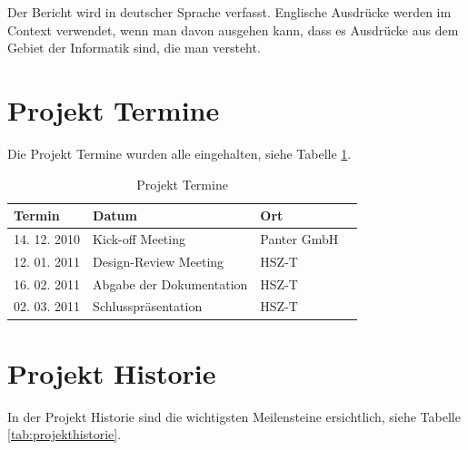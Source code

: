 \documentclass[abstracton, listof=totocnumbered,
bibliography=totocnumbered]{scrreprt}
\begin{document}
  Der Bericht wird in deutscher Sprache verfasst. Englische Ausdrücke werden im
  Context verwendet, wenn man davon ausgehen kann, dass es Ausdrücke aus dem
  Gebiet der Informatik sind, die man versteht.
  
  \newpage
  
  \section{Projekt Termine}
  
  Die Projekt Termine wurden alle eingehalten, siehe Tabelle \ref{tab:termine}.
  \newline
  
  \begin{table}[h]
    \begin{center}
      \begin{tabular}{lp{7cm}ll}
        \toprule
        Termin & Datum & Ort \\
        \midrule
        14. 12. 2010 & Kick-off Meeting & Panter GmbH\\
        12. 01. 2011 & Design-Review Meeting & HSZ-T\\
        16. 02. 2011 & Abgabe der Dokumentation & HSZ-T\\
        02. 03. 2011 & Schlusspräsentation & HSZ-T\\
        \bottomrule
      \end{tabular}
      \caption{Projekt Termine}
      \label{tab:termine}
    \end{center}
  \end{table}
  
  \section{Projekt Historie}
  
  In der Projekt Historie sind die wichtigsten Meilensteine ersichtlich, siehe
  Tabelle \ref{tab:projekthistorie}.
  \newline
  
\end{document}
